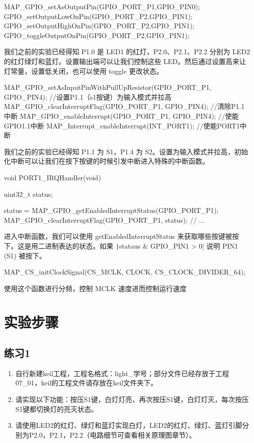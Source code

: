 \documentclass[a4paper,10pt,UTF8]{paper}
\numberwithin{equation}{section}
\numberwithin{figure}{section}
\begin{document}
\begin{ccode}
  MAP_GPIO_setAsOutputPin(GPIO_PORT_P1,GPIO_PIN0);
  GPIO_setOutputLowOnPin(GPIO_PORT_P2,GPIO_PIN1);
  GPIO_setOutputHighOnPin(GPIO_PORT_P2,GPIO_PIN1);
  GPIO_toggleOutputOnPin(GPIO_PORT_P2,GPIO_PIN1);
\end{ccode}

我们之前的实验已经得知 P1.0 是 LED1 的红灯，P2.0、P2.1、P2.2 分别为 LED2 的红灯绿灯和蓝灯。设置输出端可以让我们控制这些 LED。然后通过设置高来让灯常量，设置低关闭，也可以使用 toggle 更改状态。

\begin{ccode}
  MAP_GPIO_setAsInputPinWithPullUpResistor(GPIO_PORT_P1, GPIO_PIN4);  
  //设置P1.1（s1按键）为输入模式并拉高
  MAP_GPIO_clearInterruptFlag(GPIO_PORT_P1, GPIO_PIN4);   //清除P1.1中断 
  MAP_GPIO_enableInterrupt(GPIO_PORT_P1, GPIO_PIN4);  //使能GPIO1.1中断
  MAP_Interrupt_enableInterrupt(INT_PORT1); //使能PORT1中断
\end{ccode}

我们之前的实验已经得知 P1.1 为 S1，P1.4 为 S2。设置为输入模式并拉高，初始化中断可以让我们在按下按键的时候引发中断进入特殊的中断函数。

\begin{ccode}
  void PORT1_IRQHandler(void)
  {
    uint32_t status;

    status = MAP_GPIO_getEnabledInterruptStatus(GPIO_PORT_P1);
    MAP_GPIO_clearInterruptFlag(GPIO_PORT_P1, status);
    // ...
  }
\end{ccode}

进入中断函数，我们可以使用 getEnabledInterruptStatus 来获取哪些按键被按下。这是用二进制表达的状态。如果 \texttt|stataus & GPIO_PIN1 > 0| 说明 PIN1 (S1) 被按下。 

\begin{ccode}
  MAP_CS_initClockSignal(CS_MCLK, CLOCK, CS_CLOCK_DIVIDER_64);
\end{ccode}

使用这个函数进行分频，控制 MCLK 速度进而控制运行速度

\section{实验步骤}

\subsection{练习1}

\begin{enumerate}
  \item 自行新建keil工程，工程名格式：light\_学号；部分文件已经存放于工程07\_01，keil的工程文件请存放在keil文件夹下。
  \item 请实现以下功能：按压S1键，白灯灯亮，再次按压S1键，白灯灯灭，每次按压S1键都切换灯的亮灭状态。
  \item 请使用LED2的红灯、绿灯和蓝灯实现白灯，LED2的红灯、绿灯、蓝灯引脚分别为P2.0，P2.1，P2.2（电路细节可查看相关原理图章节）。
\end{enumerate}
\end{document}
